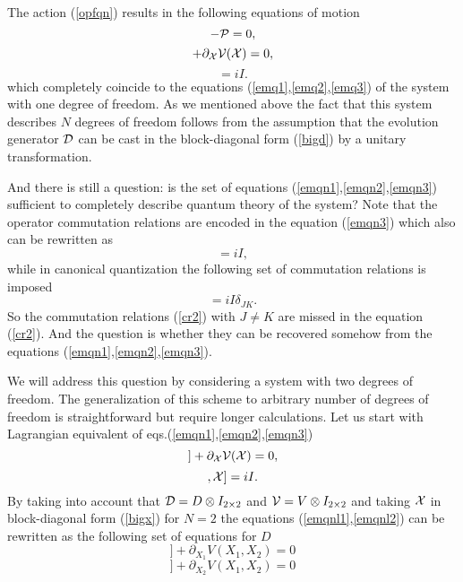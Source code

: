 \documentclass[a4paper,11pt]{article}
\begin{document}
 The action
(\ref{opfqn}) results in the following equations of motion
\begin{equation}
[{\cal D},{\cal X}]-{\cal P}=0, \label{emqn1}
\end{equation}
\begin{equation}
[{\cal D},{\cal P}] + \partial_{\cal X} {\cal V}({\cal X})=0,
\label{emqn2}
\end{equation}
\begin{equation}
[{\cal P},{\cal X}]=iI. \label{emqn3}
\end{equation}
which completely coincide to the equations
(\ref{emq1},\ref{emq2},\ref{emq3}) of the system with one degree
of freedom. As we mentioned above the fact that this system
describes $N$ degrees of freedom follows from the assumption that
the evolution generator ${\cal D}$ can be cast in the
block-diagonal form (\ref{bigd}) by a unitary transformation.


And there is still a question: is the set of equations
(\ref{emqn1},\ref{emqn2},\ref{emqn3}) sufficient to completely
describe quantum theory of the system? Note that the operator
commutation relations are encoded in the equation (\ref{emqn3})
which also can be rewritten as
\begin{equation}
[P_J,X_J]=iI, \label{cr1}
\end{equation}
while in canonical quantization the following set of commutation
relations is imposed
\begin{equation}
[P_J,X_K]=iI\delta_{JK}. \label{cr2}
\end{equation}
So the commutation relations (\ref{cr2}) with $J\not=K$ are missed
in the equation (\ref{cr2}). And the question is whether they can
be recovered somehow from the equations
(\ref{emqn1},\ref{emqn2},\ref{emqn3}).

We will address this question by considering a system with two
degrees of freedom. The generalization of this scheme to arbitrary
number of degrees of freedom is straightforward but require longer
calculations. Let us start with Lagrangian equivalent of
eqs.(\ref{emqn1},\ref{emqn2},\ref{emqn3})
\begin{equation}
[{\cal D},[{\cal D},{\cal X}]] + \partial_{\cal X} {\cal V}({\cal
X})=0, \label{emqnl1}
\end{equation}
\begin{equation}
[[{\cal D},{\cal X}],{\cal X}]=iI. \label{emqnl2}
\end{equation}
By taking into account that ${\cal D}=D\otimes I_{2\times 2}$ and
${\cal V}=V\otimes I_{2\times 2}$ and taking ${\cal X}$ in
block-diagonal form (\ref{bigx}) for $N=2$ the equations
(\ref{emqnl1},\ref{emqnl2}) can be rewritten as the following set
of equations for $D$
\begin{displaymath}
[ D, [ D,X_1 ] ] + \partial_{X_1} V(X_1,X_2)=0
\end{displaymath}
\begin{equation}
[ D, [ D,X_2 ] ] + \partial_{X_2} V(X_1,X_2)=0 \label{ep1}
\end{equation}
\end{document}
